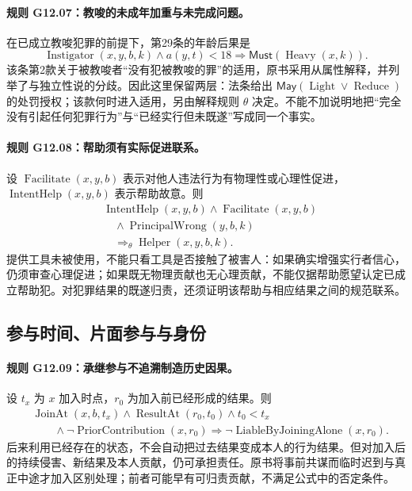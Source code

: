 \paragraph{规则 G12.07：教唆的未成年加重与未完成问题。}
在已成立教唆犯罪的前提下，第29条的年龄后果是
\[
\operatorname{Instigator}(x,y,b,k)\land a(y,t)<18
\Longrightarrow\mathsf{Must}(\operatorname{Heavy}(x,k)).
\]
该条第2款关于被教唆者“没有犯被教唆的罪”的适用，原书采用从属性解释，并列举了与独立性说的分歧。因此这里保留两层：法条给出 $\mathsf{May}(\operatorname{Light}\lor\operatorname{Reduce})$ 的处罚授权；该款何时进入适用，另由解释规则 $\theta$ 决定。不能不加说明地把“完全没有引起任何犯罪行为”与“已经实行但未既遂”写成同一个事实。

\paragraph{规则 G12.08：帮助须有实际促进联系。}
设 $\operatorname{Facilitate}(x,y,b)$ 表示对他人违法行为有物理性或心理性促进，$\operatorname{IntentHelp}(x,y,b)$ 表示帮助故意。则
\[
\begin{aligned}
&\operatorname{IntentHelp}(x,y,b)\land\operatorname{Facilitate}(x,y,b)\\
&\quad\land\operatorname{PrincipalWrong}(y,b,k)\\
&\quad\Longrightarrow_{\theta}\operatorname{Helper}(x,y,b,k).
\end{aligned}
\]
提供工具未被使用，不能只看工具是否接触了被害人：如果确实增强实行者信心，仍须审查心理促进；如果既无物理贡献也无心理贡献，不能仅据帮助愿望认定已成立帮助犯。对犯罪结果的既遂归责，还须证明该帮助与相应结果之间的规范联系。

\subsection{参与时间、片面参与与身份}
\paragraph{规则 G12.09：承继参与不追溯制造历史因果。}
设 $t_x$ 为 $x$ 加入时点，$r_0$ 为加入前已经形成的结果。则
\[
\begin{aligned}
&\operatorname{JoinAt}(x,b,t_x)\land\operatorname{ResultAt}(r_0,t_0)
\land t_0<t_x\\
&\qquad\land\neg\operatorname{PriorContribution}(x,r_0)
\Longrightarrow\neg\operatorname{LiableByJoiningAlone}(x,r_0).
\end{aligned}
\]
后来利用已经存在的状态，不会自动把过去结果变成本人的行为结果。但对加入后的持续侵害、新结果及本人贡献，仍可承担责任。原书将事前共谋而临时迟到与真正中途才加入区别处理；前者可能早有可归责贡献，不满足公式中的否定条件。

